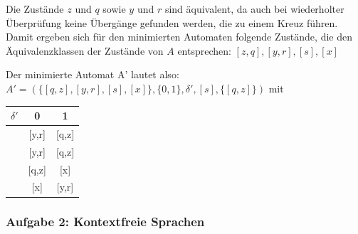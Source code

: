 \begin{teile}
	Die Zustände $z$ und $q$ sowie $y$ und $r$ sind äquivalent, da auch bei wiederholter Überprüfung keine Übergänge gefunden werden, die zu einem Kreuz führen. Damit ergeben sich für den minimierten Automaten folgende Zustände, die den Äquivalenzklassen der Zustände von $A$ entsprechen: $[z,q],[y,r],[s],[x]$
	
	Der minimierte Automat A' lautet also: \\
	$A' = (\{[q,z],[y,r],[s],[x]\},\{0,1\},\delta',[s],\{[q,z]\})$ mit

	\begin{tabular}{c|c|c}
		$\delta'$ & 0 & 1 \\
		\hline
		[s]       & [y,r]      & [q,z] 	\\
		\hline
		[x]       & [y,r]      & [q,z]	\\
		\hline
		[y,r]     & [q,z]      & [x]	\\
		\hline
		[q,z]     & [x]        & [y,r]	\\
	\end{tabular}
\end{teile}

\newpage
\subsubsection{Aufgabe 2: Kontextfreie Sprachen}

